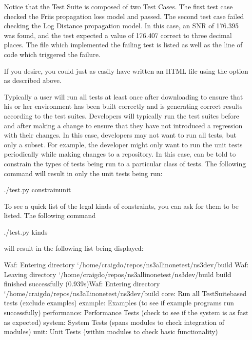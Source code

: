 \documentclass[letterpaper,10pt,english]{sphinxmanual}
\renewcommand{\sphinxcode}[1]{\texttt{\small{#1}}}
\begin{document}
Notice that the Test Suite is composed of two Test Cases.  The first test case
checked the Friis propagation loss model and passed.  The second test case
failed checking the Log Distance propagation model.  In this case, an SNR of
176.395 was found, and the test expected a value of 176.407 correct to three
decimal places.  The file which implemented the failing test is listed as well
as the line of code which triggered the failure.

If you desire, you could just as easily have written an HTML file using the
\sphinxcode{} option as described above.

Typically a user will run all tests at least once after downloading
 to ensure that his or her environment has been built correctly
and is generating correct results according to the test suites.  Developers
will typically run the test suites before and after making a change to ensure
that they have not introduced a regression with their changes.  In this case,
developers may not want to run all tests, but only a subset.  For example,
the developer might only want to run the unit tests periodically while making
changes to a repository.  In this case, \sphinxcode{} can be told to constrain
the types of tests being run to a particular class of tests.  The following
command will result in only the unit tests being run:

\begin{sphinxVerbatim}[commandchars=\\\{\}]
\PYGZdl{} ./test.py \PYGZhy{}\PYGZhy{}constrainunit
\end{sphinxVerbatim}

To see a quick list of the legal kinds of constraints, you can ask for them
to be listed.  The following command

\begin{sphinxVerbatim}[commandchars=\\\{\}]
\PYGZdl{} ./test.py \PYGZhy{}\PYGZhy{}kinds
\end{sphinxVerbatim}

will result in the following list being displayed:

\begin{sphinxVerbatim}[commandchars=\\\{\}]
Waf: Entering directory `/home/craigdo/repos/ns\PYGZhy{}3\PYGZhy{}allinone\PYGZhy{}test/ns\PYGZhy{}3\PYGZhy{}dev/build\PYGZsq{}
Waf: Leaving directory `/home/craigdo/repos/ns\PYGZhy{}3\PYGZhy{}allinone\PYGZhy{}test/ns\PYGZhy{}3\PYGZhy{}dev/build\PYGZsq{}
\PYGZsq{}build\PYGZsq{} finished successfully (0.939s)Waf: Entering directory `/home/craigdo/repos/ns\PYGZhy{}3\PYGZhy{}allinone\PYGZhy{}test/ns\PYGZhy{}3\PYGZhy{}dev/build\PYGZsq{}
core:        Run all TestSuite\PYGZhy{}based tests (exclude examples)
example:     Examples (to see if example programs run successfully)
performance: Performance Tests (check to see if the system is as fast as expected)
system:      System Tests (spans modules to check integration of modules)
unit:        Unit Tests (within modules to check basic functionality)
\end{sphinxVerbatim}
\end{document}
